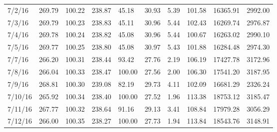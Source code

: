 \documentclass[english]{article}
\begin{document}
\begin{appendices}
\begin{table}[H]
\begin{tabular}{@{}llllllllll@{}}
7/2/16        & 269.79       & 100.22       & 238.87      & 45.18           & 30.93        & 5.39         & 101.58       & 16365.91     & 2992.00      \\
7/3/16        & 269.79       & 100.23       & 238.83      & 45.11           & 30.96        & 5.44         & 102.43       & 16269.74     & 2976.87      \\
7/4/16        & 269.78       & 100.24       & 238.82      & 45.08           & 30.96        & 5.44         & 100.67       & 16263.02     & 2990.10      \\
7/5/16        & 269.77       & 100.25       & 238.80      & 45.08           & 30.97        & 5.43         & 101.88       & 16284.48     & 2974.30      \\
7/7/16        & 266.20       & 100.31       & 238.44      & 93.42           & 27.76        & 2.19         & 106.19       & 17427.78     & 3172.96      \\
7/8/16        & 266.04       & 100.33       & 238.47      & 100.00          & 27.56        & 2.00         & 106.30       & 17541.20     & 3187.95      \\
7/9/16        & 268.81       & 100.30       & 239.08      & 82.19           & 29.73        & 4.11         & 102.09       & 16681.29     & 2326.24      \\
7/10/16       & 265.92       & 100.34       & 238.40      & 100.00          & 27.52        & 1.96         & 113.38       & 18753.12     & 3185.47      \\
7/11/16       & 267.77       & 100.32       & 238.64      & 91.16           & 29.13        & 3.41         & 108.84       & 17979.28     & 3056.29      \\
7/12/16       & 266.00       & 100.35       & 238.27      & 100.00          & 27.73        & 1.94         & 113.84       & 18543.76     & 3148.91      \\ \bottomrule
\end{tabular}
\end{table}



\end{appendices}
\end{document}
